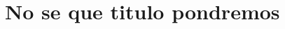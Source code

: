 \documentclass[twoside]{report}
\begin{document}



\tableofcontents





\chapter{No se que titulo pondremos}  %







\end{document}
